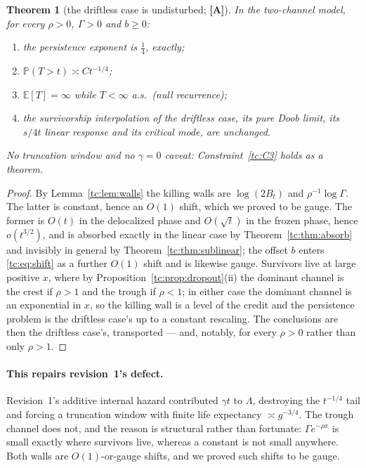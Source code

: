 \documentclass[11pt]{article}
\numberwithin{equation}{section}
\theoremstyle{plain}
\newtheorem{theorem}{Theorem}[section]
\theoremstyle{definition}
\theoremstyle{remark}
\newcommand{\E}{\mathbb{E}}
\newcommand{\PP}{\mathbb{P}}
\begin{document}
\begin{theorem}[the driftless case is undisturbed; \textbf{[A]}]
\label{tc:thm:survives}
In the two-channel model, for every $\rho>0$, $\Gamma>0$ and $b\ge0$:
\begin{enumerate}[label=\emph{(\roman*)},itemsep=1pt]
\item the persistence exponent is $\tfrac14$, exactly;
\item $\PP(T>t)\asymp Ct^{-1/4}$;
\item $\E[T]=\infty$ while $T<\infty$ a.s.\ (null recurrence);
\item the survivorship interpolation of the driftless case, its pure Doob
limit, its $s/4t$ linear response and its critical mode, are unchanged.
\end{enumerate}
\emph{No truncation window and no $\gamma=0$ caveat}:
Constraint~\ref{tc:C3} holds as a theorem.
\end{theorem}

\begin{proof}
By Lemma~\ref{tc:lem:walls} the killing walls are $\log(2B_t)$ and
$\rho^{-1}\log\Gamma$. The latter is constant, hence an $O(1)$ shift,
which we proved to be gauge. The former is $O(t)$ in the
delocalized phase and $O(\sqrt t)$ in the frozen phase, hence
$o(t^{3/2})$, and is absorbed exactly in the linear case by
Theorem~\ref{tc:thm:absorb} and invisibly in general by
Theorem~\ref{tc:thm:sublinear}; the offset $b$ enters
\eqref{tc:eq:shift} as a further $O(1)$ shift and is likewise gauge.
Survivors live at large positive $x$, where by
Proposition~\ref{tc:prop:dropout}(ii) the dominant channel is the crest
if $\rho>1$ and the trough if $\rho<1$; in either case the dominant
channel is an exponential in $x$, so the killing wall is a level of the
credit and the persistence problem is the driftless case's up to a constant
rescaling. The conclusions are then the driftless case's, transported --- and,
notably, for every $\rho>0$ rather than only $\rho>1$.
\end{proof}

\paragraph{This repairs revision~1's defect.}\label{tc:rem:repair}
Revision~1's additive internal hazard contributed $\gamma t$ to
$\Lambda$, destroying the $t^{-1/4}$ tail and forcing a truncation
window with finite life expectancy $\asymp g^{-3/4}$. The trough channel
does not, and the reason is structural rather than fortunate:
$\Gamma e^{-\rho x}$ is small exactly where survivors live, whereas a
constant is not small anywhere. Both walls are $O(1)$-or-gauge shifts,
and we proved such shifts to be gauge.
\end{document}
